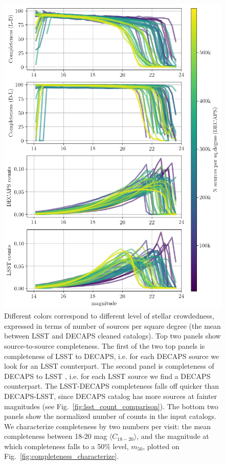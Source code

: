 \documentclass[DM,lsstdraft,toc,usenatbib]{lsstdoc}
\begin{document}
\begin{figure}
\begin{centering}
\includegraphics[width=0.75\columnwidth]{figs/completeness_4_panels_nomarker.png}
\caption{Different colors correspond to different level of stellar crowdedness, expressed in terms of number of sources per square degree (the mean between LSST and DECAPS cleaned catalogs). Top two panels show source-to-source completeness.  The first of the two top panels is completeness of  LSST to DECAPS,  i.e. for each DECAPS  source we look for an LSST counterpart.  The second  panel  is completeness of DECAPS to LSST , i.e. for each LSST source we find a DECAPS counterpart.  The LSST-DECAPS completeness falls off quicker than DECAPS-LSST, since DECAPS catalog has more sources at fainter magnitudes (see Fig.~\ref{fig:lsst_count_comparison}). The bottom two panels show the normalized number of counts  in the input catalogs.  We characterize completeness by two numbers per visit:  the mean completeness between 18-20 mag $\langle C_{18-20} \rangle$, and the magnitude at which completeness falls to a 50\% level,  $m_{50}$, plotted on Fig.~\ref{fig:completeness_characterize}.}
\label{fig:completeness}
\end{centering}
\end{figure} 
\end{document}
